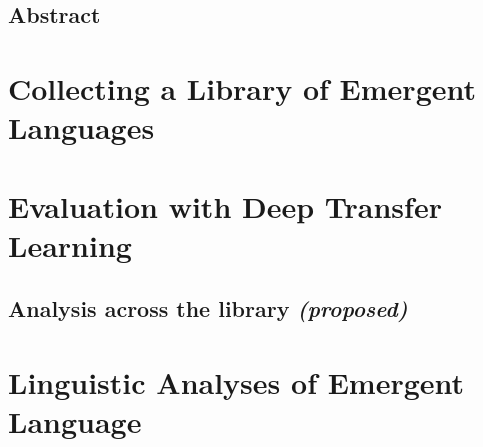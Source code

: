 





\newpage
\thispagestyle{plain}
\section*{Abstract}

\newpage
\tableofcontents*



\chapter{Collecting a Library of Emergent Languages}


\chapter{Evaluation with Deep Transfer Learning}

\section{Analysis across the library \emph{(proposed)}}


\chapter{Linguistic Analyses of Emergent Language}



